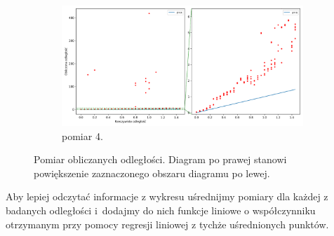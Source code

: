 \begin{figure}[H]
    \ContinuedFloat\centering
    \begin{subfigure}{\textwidth}
        \centering
        \includegraphics[width=\textwidth]{pics/mic_sync_dist/dists_long_3.png}
        \caption{pomiar 4.}
        \label{pic:slope_test_3}
    \end{subfigure}
    \caption[Pomiar obliczanych odległości]{Pomiar obliczanych odległości. Diagram po prawej stanowi powiększenie zaznaczonego obszaru diagramu po lewej.}
    \label{fig:slope_test}
\end{figure}

Aby lepiej odczytać informacje z wykresu uśrednijmy pomiary dla każdej z badanych odległości i~dodajmy do nich funkcje liniowe o współczynniku otrzymanym przy pomocy regresji liniowej z tychże uśrednionych punktów.

